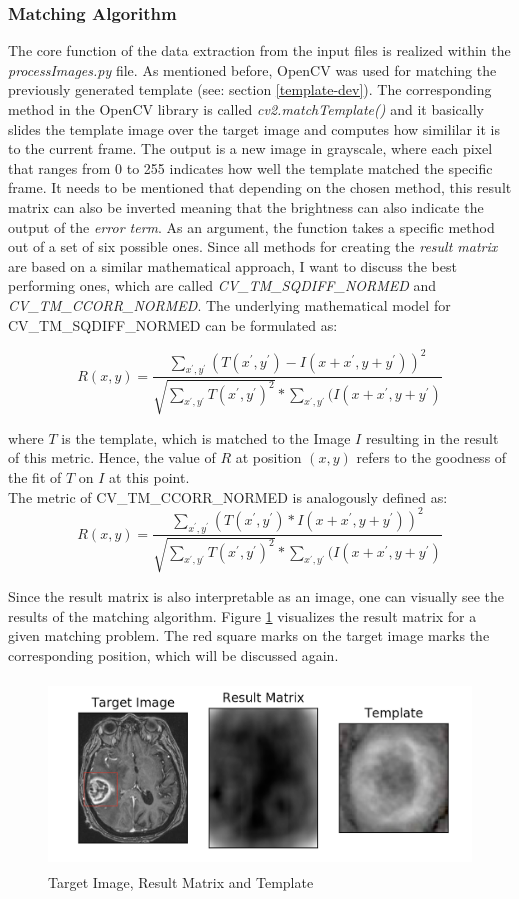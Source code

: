 \documentclass[twoside,11pt]{article}
\begin{document}
\subsubsection{Matching Algorithm}
The core function of the data extraction from the input files is realized within the \textit{processImages.py} file. As mentioned before, OpenCV was used for matching the previously generated template (see: section \ref{template-dev}). The corresponding method in the OpenCV library is called \textit{cv2.matchTemplate()} and it basically slides the template image over the target image and computes how simililar it is to the current frame. The output is a new image in grayscale, where each pixel that ranges from 0 to 255 indicates how well the template matched the specific frame. It needs to be mentioned that depending on the chosen method, this result matrix can also be inverted meaning that the brightness can also indicate the output of the \textit{error term}.
As an argument, the function takes a specific method out of a set of six possible ones. Since all methods for creating the \textit{result matrix} are based on a similar mathematical approach, I want to discuss the best performing ones, which are called \textit{CV\_TM\_SQDIFF\_NORMED} and \textit{CV\_TM\_CCORR\_NORMED}. The underlying mathematical model for CV\_TM\_SQDIFF\_NORMED can be formulated as:

$$
R(x,y) = \frac{\sum_{x^{'},y^{'}}^{}(T(x^{'},y^{'})-I(x+x^{'},y+y^{'}))^2}{\sqrt{\sum_{x^{'},y^{'}}^{}T(x^{'},y^{'})^2}*\sum_{x^{'},y^{'}}^{}(I(x+x^{'},y+y^{'})}
$$

where $T$ is the template, which is matched to the Image $I$ resulting in the result of this metric. Hence, the value of $R$ at position $(x,y)$ refers to the goodness of the fit of $T$ on $I$ at this point. \\
The metric of CV\_TM\_CCORR\_NORMED is analogously defined as: 
$$
R(x,y) = \frac{\sum_{x^{'},y^{'}}^{}(T(x^{'},y^{'})*I(x+x^{'},y+y^{'}))^2}{\sqrt{\sum_{x^{'},y^{'}}^{}T(x^{'},y^{'})^2}*\sum_{x^{'},y^{'}}^{}(I(x+x^{'},y+y^{'})}
$$
\citep{opencvmethods}

Since the result matrix is also interpretable as an image, one can visually see the results of the matching algorithm. Figure \ref{fig:result-matrix} visualizes the result matrix for a given matching problem. The red square marks on the target image marks the corresponding position, which will be discussed again.

\begin{figure}
	\label{fig:result-matrix}
	\centering
	\includegraphics[height=5cm]{result-matrix}
	\caption{Target Image, Result Matrix and Template}
\end{figure}%
\end{document}
